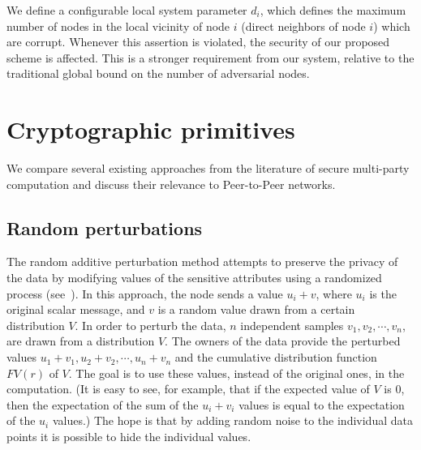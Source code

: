 \documentclass[times, 10pt,twocolumn]{article}
\begin{document}
We define a configurable local system parameter $d_i$, which
defines the maximum number of nodes in the local vicinity of node $i$
(direct neighbors of node $i$) which are corrupt. Whenever this
assertion is violated, the security of our proposed scheme is
affected. This is a stronger requirement from our system, relative
to the traditional global bound on the number of adversarial
nodes.
\section{Cryptographic primitives}
\label{crypto} We compare several existing approaches from the
literature of secure multi-party computation and discuss their
relevance to Peer-to-Peer networks.

\subsection{Random perturbations}
The random additive perturbation method attempts to preserve the
privacy of the data by modifying values of the sensitive
attributes using a randomized process
(see~\cite{AS,DiNi,RandomNoise}). In this approach, the node sends
a value $u_i + v$, where $u_i$ is the original scalar message, and
$v$ is a random value drawn from a certain distribution $V$. In
order to perturb the data, $n$ independent samples $v_1, v_2,
\cdots , v_n$, are drawn from a distribution $V$. The owners of
the data provide the perturbed values $u_1+v_1, u_2+v_2, \cdots ,
u_n+v_n$ and the cumulative distribution function $FV(r)$ of $V$.
The goal is to use these values, instead of the original ones, in
the computation. (It is easy to see, for example, that if the
expected value of $V$ is $0$, then the expectation of the sum of
the $u_i+v_i$ values is equal to the expectation of the $u_i$
values.) The hope is that by adding random noise to the individual
data points it is possible to hide the individual values.

\end{document}
